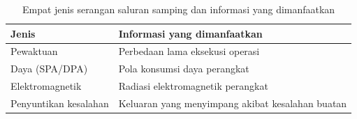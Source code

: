 \begin{table}[htbp]
    \centering
    \caption{Empat jenis serangan saluran samping dan informasi yang dimanfaatkan}
    \label{tab:side-channel}
    \small
    \begin{tabularx}{\linewidth}{@{}l >{\raggedright\arraybackslash}X@{}}
        \hline
        \textbf{Jenis} & \textbf{Informasi yang dimanfaatkan} \\
        \hline
        Pewaktuan & Perbedaan lama eksekusi operasi \\
        \hline
        Daya (SPA/DPA) & Pola konsumsi daya perangkat \\
        \hline
        Elektromagnetik & Radiasi elektromagnetik perangkat \\
        \hline
        Penyuntikan kesalahan & Keluaran yang menyimpang akibat kesalahan buatan \\
        \hline
    \end{tabularx}
\end{table}
